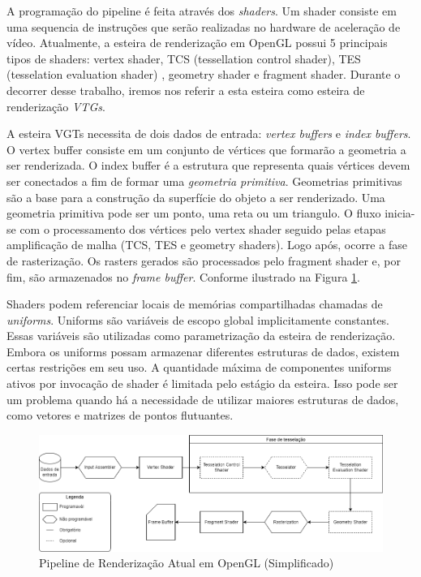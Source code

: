 A programação do pipeline é feita através dos \textit{shaders}. Um shader consiste em uma sequencia de instruções que serão realizadas no hardware de aceleração de vídeo. Atualmente, a esteira de renderização em OpenGL possui 5 principais tipos de shaders: vertex shader, TCS (tessellation control shader), TES (tesselation evaluation shader) \cite{WIKI_OPENGL_TESSELATION}, geometry shader e fragment shader. Durante o decorrer desse trabalho, iremos nos referir a esta esteira como esteira de renderização \textit{VTGs}.

A esteira VGTs necessita de dois dados de entrada: \textit{vertex buffers} e \textit{index buffers}. O vertex buffer consiste em um conjunto de vértices que formarão a geometria a ser renderizada. O index buffer é a estrutura que representa quais vértices devem ser conectados a fim de formar uma \textit{geometria primitiva}. Geometrias primitivas são a base para a construção da superfície do objeto a ser renderizado. Uma geometria primitiva pode ser um ponto, uma reta ou um triangulo. O fluxo inicia-se com o processamento dos vértices pelo vertex shader seguido pelas etapas amplificação de malha (TCS, TES e geometry shaders). Logo após, ocorre a fase de rasterização. Os rasters gerados são processados pelo fragment shader e, por fim, são armazenados no \textit{frame buffer}. Conforme ilustrado na Figura \ref{fig:LABEL_FIG_PIPELINE_ATUAL}.

Shaders podem referenciar locais de memórias compartilhadas chamadas de \textit{uniforms}. Uniforms são variáveis de escopo global implicitamente constantes. Essas variáveis são utilizadas como parametrização da esteira de renderização. Embora os uniforms possam armazenar diferentes estruturas de dados, existem certas restrições em seu uso. A quantidade máxima de componentes uniforms ativos por invocação de shader é limitada pelo estágio da esteira. Isso pode ser um problema quando há a necessidade de utilizar maiores estruturas de dados, como vetores e matrizes de pontos flutuantes.


\begin{figure}
\centering
\includegraphics[width=1\textwidth]{imagens/PipelineRenderizacaoOpenGL.png}
\caption{Pipeline de Renderização Atual em OpenGL (Simplificado)}
\label{fig:LABEL_FIG_PIPELINE_ATUAL}
\end{figure}

